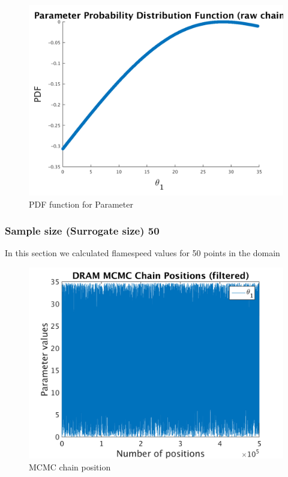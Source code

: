 \begin{figure}[h!]
  
  \centering
   \includegraphics[scale=0.75]{output_20/ip_logLike_unified}
   \caption{PDF function for Parameter }
\end{figure}


\subsubsection{Sample size (Surrogate size) 50 }


In this section we calculated flamespeed values for 50 points in the domain 
\begin{figure}[h!]
  
  \centering
   \includegraphics[scale=0.75]{output_50/simple_ip_chain_pos_filt}
   \caption{MCMC chain position }
\end{figure}


